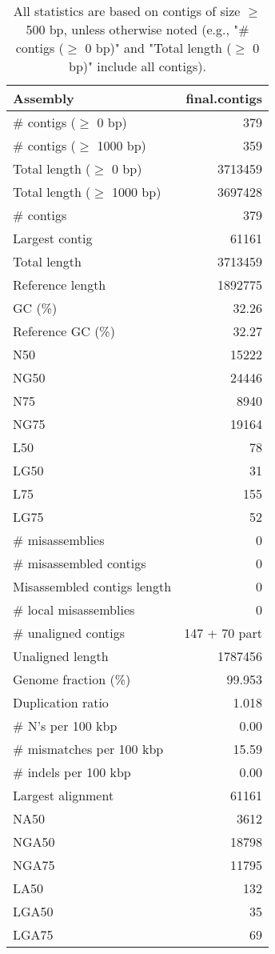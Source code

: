 \documentclass[12pt,a4paper]{article}
\begin{document}
\begin{table}[ht]
\begin{center}
\caption{All statistics are based on contigs of size $\geq$ 500 bp, unless otherwise noted (e.g., "\# contigs ($\geq$ 0 bp)" and "Total length ($\geq$ 0 bp)" include all contigs).}
\begin{tabular}{|l*{1}{|r}|}
\hline
Assembly & final.contigs \\ \hline
\# contigs ($\geq$ 0 bp) & 379 \\ \hline
\# contigs ($\geq$ 1000 bp) & 359 \\ \hline
Total length ($\geq$ 0 bp) & 3713459 \\ \hline
Total length ($\geq$ 1000 bp) & 3697428 \\ \hline
\# contigs & 379 \\ \hline
Largest contig & 61161 \\ \hline
Total length & 3713459 \\ \hline
Reference length & 1892775 \\ \hline
GC (\%) & 32.26 \\ \hline
Reference GC (\%) & 32.27 \\ \hline
N50 & 15222 \\ \hline
NG50 & 24446 \\ \hline
N75 & 8940 \\ \hline
NG75 & 19164 \\ \hline
L50 & 78 \\ \hline
LG50 & 31 \\ \hline
L75 & 155 \\ \hline
LG75 & 52 \\ \hline
\# misassemblies & 0 \\ \hline
\# misassembled contigs & 0 \\ \hline
Misassembled contigs length & 0 \\ \hline
\# local misassemblies & 0 \\ \hline
\# unaligned contigs & 147 + 70 part \\ \hline
Unaligned length & 1787456 \\ \hline
Genome fraction (\%) & 99.953 \\ \hline
Duplication ratio & 1.018 \\ \hline
\# N's per 100 kbp & 0.00 \\ \hline
\# mismatches per 100 kbp & 15.59 \\ \hline
\# indels per 100 kbp & 0.00 \\ \hline
Largest alignment & 61161 \\ \hline
NA50 & 3612 \\ \hline
NGA50 & 18798 \\ \hline
NGA75 & 11795 \\ \hline
LA50 & 132 \\ \hline
LGA50 & 35 \\ \hline
LGA75 & 69 \\ \hline
\end{tabular}
\end{center}
\end{table}
\end{document}
